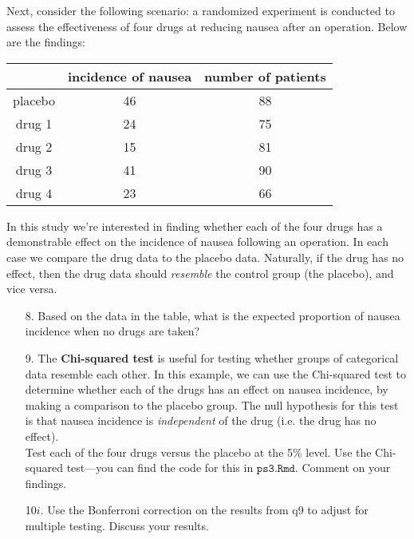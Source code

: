 \documentclass[10pt]{extarticle}
\begin{document}
Next, consider the following scenario: a randomized experiment is conducted to assess the effectiveness of four drugs at reducing nausea after an operation. Below are the findings: \\  

\begin{center}
        \begin{tabular}{c c c}
                \hline
                  & incidence of nausea & number of patients \\
                 \hline
                 placebo & 46 & 88 \\
                 drug 1 & 24 & 75 \\
                 drug 2 & 15 & 81 \\
		 drug 3 & 41 & 90 \\ 
		 drug 4 & 23 & 66 \\ 
                 \hline
        \end{tabular}
\end{center} 

\hfill 

In this study we're interested in finding whether each of the four drugs has a demonstrable effect on the incidence of nausea following an operation. In each case we compare the drug data to the placebo data. Naturally, if the drug has no effect, then the drug data should {\it resemble} the control group (the placebo), and vice versa.  

\hfill 

\begin{itemize}

	\item[8.] Based on the data in the table, what is the expected proportion of nausea incidence when no drugs are taken? \\ 

	\item[9.] The {\bf Chi-squared test} is useful for testing whether groups of categorical data resemble each other. In this example, we can use the Chi-squared test to determine whether each of the drugs has an effect on nausea incidence, by making a comparison to the placebo group. The null hypothesis for this test is that nausea incidence is {\it independent} of the drug (i.e. the drug has no effect). \\

Test each of the four drugs versus the placebo at the 5\% level. Use the Chi-squared test---you can find the code for this in $\texttt{ps3.Rmd}$. Comment on your findings. \\ 

	 \item[10$i$.] Use the Bonferroni correction on the results from q9 to adjust for multiple testing. Discuss your results. 

\end{itemize}
\end{document}
